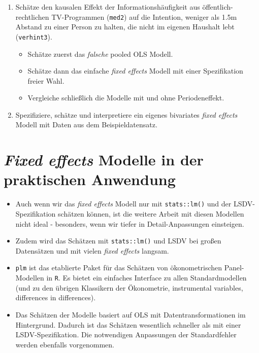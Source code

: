 \documentclass[
]{book}
\providecommand{\tightlist}{%
  \setlength{\itemsep}{0pt}\setlength{\parskip}{0pt}}
\begin{document}
\begin{enumerate}
\def\labelenumi{\arabic{enumi})}
\tightlist
\item
  Schätze den kausalen Effekt der Informationshäufigkeit aus öffentlich-rechtlichen TV-Programmen (\texttt{med2}) auf die Intention, weniger als 1.5m Abstand zu einer Person zu halten, die nicht im eigenen Haushalt lebt (\texttt{verhint3}).

  \begin{itemize}
  \tightlist
  \item
    Schätze zuerst das \emph{falsche} pooled OLS Modell.
  \item
    Schätze dann das einfache \emph{fixed effects} Modell mit einer Spezifikation freier Wahl.
  \item
    Vergleiche schließlich die Modelle mit und ohne Periodeneffekt.
  \end{itemize}
\item
  Spezifiziere, schätze und interpretiere ein eigenes bivariates \emph{fixed effects} Modell mit Daten aus dem Beispieldatensatz.
\end{enumerate}

\hypertarget{fixed-effects-modelle-in-der-praktischen-anwendung}{%
\section{\texorpdfstring{\emph{Fixed effects} Modelle in der praktischen Anwendung}{Fixed effects Modelle in der praktischen Anwendung}}\label{fixed-effects-modelle-in-der-praktischen-anwendung}}

\begin{itemize}
\tightlist
\item
  Auch wenn wir das \emph{fixed effects} Modell nur mit \texttt{stats::lm()} und der LSDV-Spezifikation schätzen können, ist die weitere Arbeit mit diesen Modellen nicht ideal - besonders, wenn wir tiefer in Detail-Anpassungen einsteigen.
\item
  Zudem wird das Schätzen mit \texttt{stats::lm()} und LSDV bei großen Datensätzen und mit vielen \emph{fixed effects} langsam.
\item
  \texttt{plm} \citep{R-plm} ist das etablierte Paket für das Schätzen von ökonometrischen Panel-Modellen in \texttt{R}. Es bietet ein einfaches Interface zu allen Standardmodellen (und zu den übrigen Klassikern der Ökonometrie, instrumental variables, differences in differences).
\item
  Das Schätzen der Modelle basiert auf OLS mit Datentransformationen im Hintergrund. Dadurch ist das Schätzen wesentlich schneller als mit einer LSDV-Spezifikation. Die notwendigen Anpassungen der Standardfehler werden ebenfalls vorgenommen.
\end{itemize}
\end{document}
